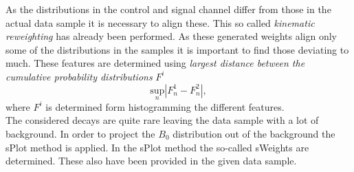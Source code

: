 As the distributions in the control and signal channel differ from those in the actual data sample it is necessary to align these. This so called \textit{kinematic reweighting} has already been performed. As these generated weights align only some of the distributions in the samples it is important to find those deviating to much. These features are determined using \textit{largest distance between the cumulative probability distributions} $F^i$
\begin{equation}
	\underset{n}{\mathrm{sup}}\left|F^1_n - F^2_n\right|,
	\label{eq:ks_test}
\end{equation}
where $F^i$ is determined form histogramming the different features.\\

The considered decays are quite rare leaving the data sample with a lot of background. In order to project the $B_0$ distribution out of the background the sPlot method is applied. In the sPlot method the so-called sWeights are determined. These also have been provided in the given data sample.